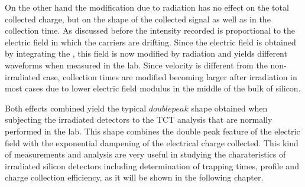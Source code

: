 On the other hand the \neff modification due to radiation has no effect on the total collected charge, but on the shape of the collected signal as well as in the collection time. As discussed before the intensity recorded is proportional to the electric field in which the carriers are drifting. Since the electric field is obtained by integrating the \neff, this field is now modified by radiation and yields different waveforms when measured in the lab. Since velocity is different from the non-irradiated case, collection times are modified becoming larger after irradiation in most cases due to lower electric field modulus in the middle of the bulk of silicon. 

Both effects combined yield the typical $double peak$ shape obtained when subjecting the irradiated detectors to the TCT analysis that are normally performed in the lab. This shape combines the double peak feature of the electric field with the exponential dampening of the electrical charge collected. This kind of measurements and analysis are very useful in studying the charateristics of irradiated silicon detectors including determination of trapping times, \neff profile and charge collection efficiency, as it will be shown in the following chapter.






















